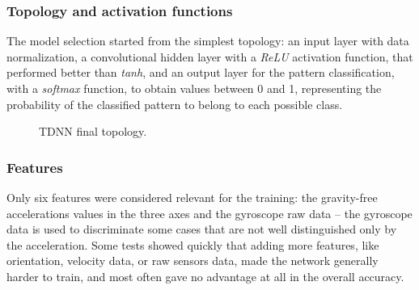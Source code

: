 \subsubsection{Topology and activation functions}
The model selection started from the simplest topology: an input layer with data normalization, a convolutional hidden layer with a \textit{ReLU} activation function, that performed better than \textit{tanh}, and an output layer for the pattern classification, with a \textit{softmax} function, to obtain values between 0 and 1, representing the probability of the classified pattern to belong to each possible class.
\bigbreak

\begin{center}
	\begin{figure}[ht!]
		\caption{TDNN final topology.}
	\end{figure}
\end{center}

\subsubsection{Features}
Only six features were considered relevant for the training: the gravity-free accelerations values in the three axes and the gyroscope raw data – the gyroscope data is used to discriminate some cases that are not well distinguished only by the acceleration. Some tests showed quickly that adding more features, like orientation, velocity data, or raw sensors data, made the network generally harder to train, and most often gave no advantage at all in the overall accuracy.

